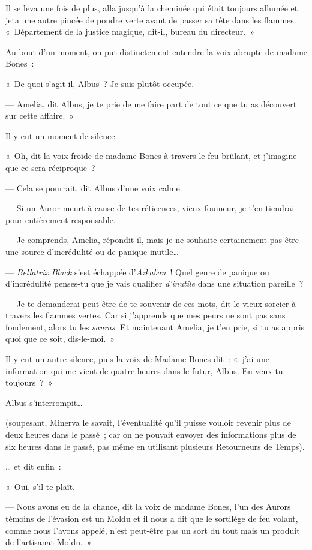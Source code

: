 Il se leva une fois de plus, alla jusqu'à la cheminée qui était toujours allumée et jeta une autre pincée de poudre verte avant de passer sa tête dans les flammes. «~Département de la justice magique, dit-il, bureau du directeur.~»

Au bout d'un moment, on put distinctement entendre la voix abrupte de madame Bones~:

«~De quoi s'agit-il, Albus~? Je suis plutôt occupée.

--- Amelia, dit Albus, je te prie de me faire part de tout ce que tu as découvert sur cette affaire.~»

Il y eut un moment de silence.

«~Oh, dit la voix froide de madame Bones à travers le feu brûlant, et j'imagine que ce sera réciproque~?

--- Cela se pourrait, dit Albus d'une voix calme.

--- Si un Auror meurt à cause de tes réticences, vieux fouineur, je t'en tiendrai pour entièrement responsable.

--- Je comprends, Amelia, répondit-il, mais je ne souhaite certainement pas être une source d'incrédulité ou de panique inutile…

--- \emph{Bellatrix Black} s'est échappée d'\emph{Azkaban}~! Quel genre de panique ou d'incrédulité penses-tu que je vais qualifier \emph{d'inutile} dans une situation pareille~?

--- Je te demanderai peut-être de te souvenir de ces mots, dit le vieux sorcier à travers les flammes vertes. Car si j'apprends que mes peurs ne sont pas sans fondement, alors tu les \emph{sauras}. Et maintenant Amelia, je t'en prie, si tu as appris quoi que ce soit, dis-le-moi.~»

Il y eut un autre silence, puis la voix de Madame Bones dit~: «~j'ai une information qui me vient de quatre heures dans le futur, Albus. En veux-tu toujours~?~»

Albus s'interrompit…

(soupesant, Minerva le savait, l'éventualité qu'il puisse vouloir revenir plus de deux heures dans le passé~; car on ne pouvait envoyer des informations plus de six heures dans le passé, pas même en utilisant plusieurs Retourneurs de Temps).

… et dit enfin~:

«~Oui, s'il te plaît.

--- Nous avons eu de la chance, dit la voix de madame Bones, l'un des Aurors témoins de l'évasion est un Moldu et il nous a dit que le sortilège de feu volant, comme nous l'avons appelé, n'est peut-être pas un sort du tout mais un produit de l'artisanat Moldu.~»

